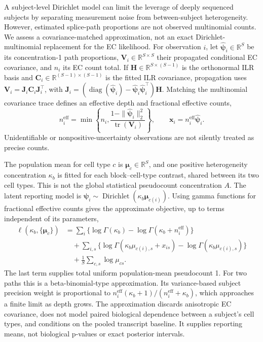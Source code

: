 \documentclass[11pt]{article}
\begin{document}
A subject-level Dirichlet model can limit the leverage of deeply sequenced subjects by separating measurement noise from between-subject heterogeneity. However, estimated splice-path proportions are not observed multinomial counts. We assess a covariance-matched approximation, not an exact Dirichlet-multinomial replacement for the EC likelihood. For observation \(i\), let \(\widehat{\boldsymbol\psi}_i\in\mathbb R^S\) be its concentration-1 path proportions, \(\mathbf V_i\in\mathbb R^{S\times S}\) their propagated conditional EC covariance, and \(n_i\) its EC count total. If \(\mathbf H\in\mathbb R^{S\times(S-1)}\) is the orthonormal ILR basis and \(\mathbf C_i\in\mathbb R^{(S-1)\times(S-1)}\) is the fitted ILR covariance, propagation uses \(\mathbf V_i=\mathbf J_i\mathbf C_i\mathbf J_i^\top\), with \(\mathbf J_i=(\operatorname{diag}(\widehat{\boldsymbol\psi}_i)-\widehat{\boldsymbol\psi}_i\widehat{\boldsymbol\psi}_i^\top)\mathbf H\). Matching the multinomial covariance trace defines an effective depth and fractional effective counts, \begin{equation}n_i^{\mathrm{eff}}=\min\left\{n_i,\frac{1-\|\widehat{\boldsymbol\psi}_i\|_2^2}{\operatorname{tr}(\mathbf V_i)}\right\},\qquad \mathbf x_i=n_i^{\mathrm{eff}}\widehat{\boldsymbol\psi}_i.\end{equation} Unidentifiable or nonpositive-uncertainty observations are not silently treated as precise counts.

The population mean for cell type \(c\) is \(\boldsymbol\mu_c\in\mathbb R^S\), and one positive heterogeneity concentration \(\kappa_b\) is fitted for each block--cell-type contrast, shared between its two cell types. This is not the global statistical pseudocount concentration \(A\). The latent reporting model is \(\boldsymbol\psi_i\sim\operatorname{Dirichlet}(\kappa_b\boldsymbol\mu_{c(i)})\). Using gamma functions for fractional effective counts gives the approximate objective, up to terms independent of its parameters, \begin{equation}\begin{aligned}\ell(\kappa_b,\{\boldsymbol\mu_c\})&=\sum_i\{\log\Gamma(\kappa_b)-\log\Gamma(\kappa_b+n_i^{\mathrm{eff}})\}\\&\quad+\sum_{i,s}\{\log\Gamma(\kappa_b\mu_{c(i),s}+x_{is})-\log\Gamma(\kappa_b\mu_{c(i),s})\}\\&\quad+\frac1S\sum_{c,s}\log\mu_{cs}.\end{aligned}\end{equation} The last term supplies total uniform population-mean pseudocount 1. For two paths this is a beta-binomial-type approximation. Its variance-based subject precision weight is proportional to \(n_i^{\mathrm{eff}}(\kappa_b+1)/(n_i^{\mathrm{eff}}+\kappa_b)\), which approaches a finite limit as depth grows. The approximation discards anisotropic EC covariance, does not model paired biological dependence between a subject's cell types, and conditions on the pooled transcript baseline. It supplies reporting means, not biological p-values or exact posterior intervals.
\end{document}
